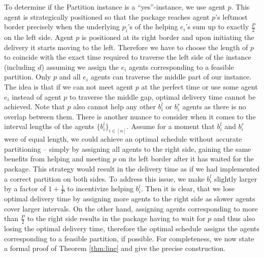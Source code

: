 To determine if the Partition instance is a ``yes''-instance, we use agent $p$. This agent is strategically positioned so that the package reaches agent $p$'s leftmost border precisely when the underlying $p_i$'s of the helping $e_i$'s sum up to exactly $\frac{P}{2}$ on the left side. Agent $p$ is positioned at its right border and upon initiating the delivery it starts moving to the left. Therefore we have to choose the length of $p$ to coincide with the exact time required to traverse the left side of the instance (including $d$) assuming we assign the $e_i$ agents corresponding to a feasible partition.
Only $p$ and all $e_i$ agents can traverse the middle part of our instance. The idea is that if we can not meet agent $p$ at the perfect time or use some agent $e_i$ instead of agent $p$ to traverse the middle gap, optimal delivery time cannot be achieved. %
Note that $p$ also cannot help any other $b_i^l$ or $b_i^r$ agents as there is no overlap between them.
There is another nuance to consider when it comes to the interval lengths of the agents $\{b^l_i\}_{i\in [n]}$. Assume for a moment that $b_i^l$ and $b_i^r$
were of equal length, we could achieve an optimal schedule without accurate partitioning – simply by assigning all agents to the right side, gaining the same benefits from helping and meeting $p$ on its left border after it has waited for the package. This strategy would result in the delivery time as if we had implemented a correct partition on both sides. To address this issue, we make  $b_i^l$ slightly larger by a factor of  $1+\frac{1}{P}$ to incentivize helping $b^l_i$. %
Then it is clear, that we lose optimal delivery time by assigning more agents to the right side as slower agents cover larger intervals. On the other hand, assigning agents corresponding to more than $\frac{P}{2}$ to the right side results in the package having to wait for $p$ and thus also losing the optimal delivery time, therefore the optimal schedule assigns the agents corresponding to a feasible partition, if possible. For completeness, we now state a formal proof of Theorem \ref{thm:line} and give the precise construction.

